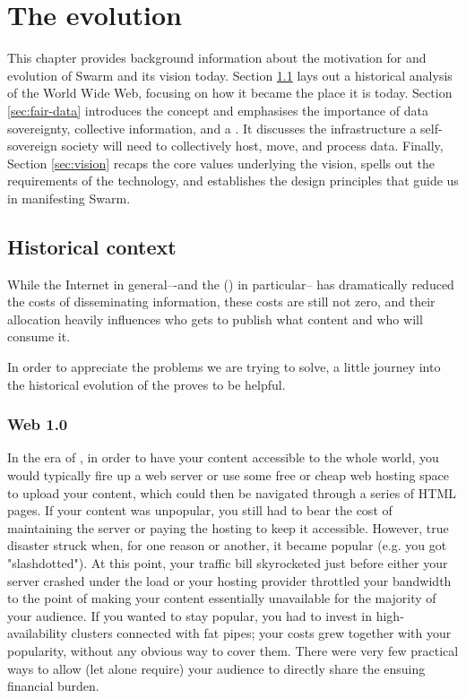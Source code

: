 \chapter{The evolution  \statusgreen}\label{chap:vision}



This chapter provides background information about the motivation for and evolution of Swarm and its vision today. Section \ref{sec:historical_context} lays out a historical analysis of the World Wide Web, focusing on how it became the place it is today.
Section \ref{sec:fair-data} introduces the concept and emphasises the importance of data sovereignty, collective information, and a . It discusses the infrastructure a self-sovereign society will need to collectively host, move, and process data.
Finally, Section \ref{sec:vision} recaps the core values underlying the vision, spells out the requirements of the technology, and establishes the design principles that guide us in manifesting Swarm.

\section{Historical context  \statusgreen}\label{sec:historical_context}
\green{}
While the Internet in general–-and the  () in particular-- has dramatically reduced the costs of disseminating information, these costs are still not zero, and their allocation heavily influences who gets to publish what content and who will consume it.

In order to appreciate the problems we are trying to solve, a little journey into the historical evolution of the  proves to be helpful.

\subsection{Web 1.0 \statusgreen}\label{sec:web_1}

In the era of , in order to have your content accessible to the whole world, you would typically fire up a web server or use some free or cheap web hosting space to upload your content, which could then be navigated through a series of HTML pages. If your content was unpopular, you still had to bear the cost of maintaining the server or paying the hosting to keep it accessible. However, true disaster struck when, for one reason or another, it became popular (e.g. you got "slashdotted"). At this point, your traffic bill skyrocketed just before either your server crashed under the load or your hosting provider throttled your bandwidth to the point of making your content essentially unavailable for the majority of your audience. If you wanted to stay popular, you had to invest in high-availability clusters connected with fat pipes; your costs grew together with your popularity, without any obvious way to cover them. There were very few practical ways to allow (let alone require) your audience to directly share the ensuing financial burden.

